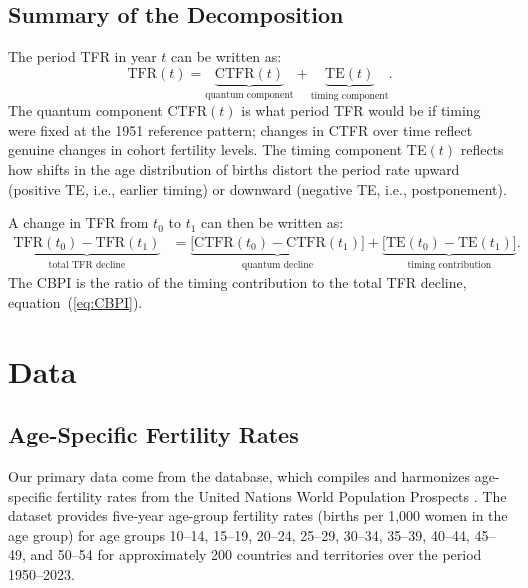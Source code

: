 \documentclass[12pt]{article}
\begin{document}
\subsection{Summary of the Decomposition}

The period TFR in year $t$ can be written as:
\begin{equation}
    \mathrm{TFR}(t) = \underbrace{\mathrm{CTFR}(t)}_{\text{quantum component}}
                    + \underbrace{\mathrm{TE}(t)}_{\text{timing component}}.
    \label{eq:decomp}
\end{equation}
The quantum component CTFR$(t)$ is what period TFR would be if timing
were fixed at the 1951 reference pattern; changes in CTFR over time
reflect genuine changes in cohort fertility levels.  The timing
component TE$(t)$ reflects how shifts in the age distribution of
births distort the period rate upward (positive TE, i.e., earlier
timing) or downward (negative TE, i.e., postponement).

A change in TFR from $t_0$ to $t_1$ can then be written as:
\begin{align}
    \underbrace{\mathrm{TFR}(t_0) - \mathrm{TFR}(t_1)}_{\text{total TFR decline}}
    &= \underbrace{\bigl[\mathrm{CTFR}(t_0) - \mathrm{CTFR}(t_1)\bigr]}_{\text{quantum decline}}
     + \underbrace{\bigl[\mathrm{TE}(t_0) - \mathrm{TE}(t_1)\bigr]}_{\text{timing contribution}}.
    \label{eq:decomp_change}
\end{align}
The CBPI is the ratio of the timing contribution to the total TFR
decline, equation~(\ref{eq:CBPI}).

\section{Data}
\label{sec:data}

\subsection{Age-Specific Fertility Rates}

Our primary data come from the \citet{OWID2024} database, which
compiles and harmonizes age-specific fertility rates from the United
Nations World Population Prospects \citep{UNWPP2022}.  The dataset
provides five-year age-group fertility rates (births per 1{,}000 women
in the age group) for age groups 10--14, 15--19, 20--24, 25--29,
30--34, 35--39, 40--44, 45--49, and 50--54 for approximately 200
countries and territories over the period 1950--2023.
\end{document}
